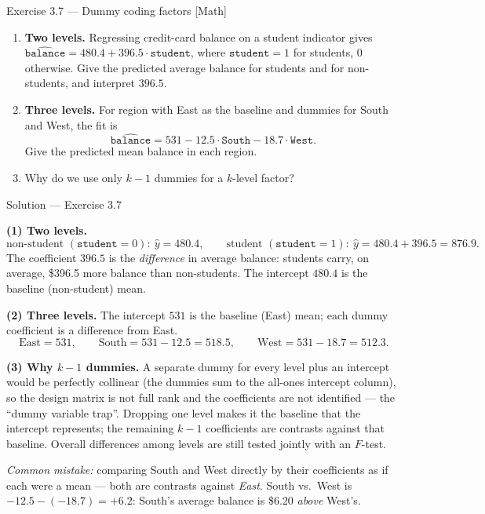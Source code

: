 \documentclass[aspectratio=169,11pt]{beamer}
\begin{document}
\begin{frame}{Exercise 3.7 --- Dummy coding factors [Math]}
  \begin{exercise}
    \begin{enumerate}
      \item \textbf{Two levels.} Regressing credit-card balance on a
            student indicator gives
            $\widehat{\texttt{balance}} = 480.4 + 396.5\cdot
            \texttt{student}$, where $\texttt{student}=1$ for students,
            $0$ otherwise. Give the predicted average balance for
            students and for non-students, and interpret $396.5$.
      \item \textbf{Three levels.} For region with East as the baseline
            and dummies for South and West, the fit is
            \[
              \widehat{\texttt{balance}} = 531 - 12.5\cdot\texttt{South}
                - 18.7\cdot\texttt{West}.
            \]
            Give the predicted mean balance in each region.
      \item Why do we use only $k-1$ dummies for a $k$-level factor?
    \end{enumerate}
  \end{exercise}
\end{frame}

\begin{frame}{Solution --- Exercise 3.7}
  \begin{solutionbox}
    \scriptsize
    \textbf{(1) Two levels.}
    \[
      \text{non-student }(\texttt{student}=0):\ \hat y = 480.4,\qquad
      \text{student }(\texttt{student}=1):\ \hat y = 480.4+396.5 = 876.9.
    \]
    The coefficient $396.5$ is the \emph{difference} in average balance:
    students carry, on average, \$396.5 more balance than non-students.
    The intercept $480.4$ is the baseline (non-student) mean.

    \textbf{(2) Three levels.} The intercept $531$ is the baseline
    (East) mean; each dummy coefficient is a difference from East.
    \[
      \text{East}=531,\qquad
      \text{South}=531-12.5=518.5,\qquad
      \text{West}=531-18.7=512.3.
    \]

    \textbf{(3) Why $k-1$ dummies.} A separate dummy for every level
    plus an intercept would be perfectly collinear (the dummies sum to
    the all-ones intercept column), so the design matrix is not full
    rank and the coefficients are not identified --- the ``dummy
    variable trap''. Dropping one level makes it the baseline that the
    intercept represents; the remaining $k-1$ coefficients are
    contrasts against that baseline. Overall differences among levels
    are still tested jointly with an $F$-test.

    \medskip
    \textit{Common mistake:} comparing South and West directly by their
    coefficients as if each were a mean --- both are contrasts against
    \emph{East}. South vs.\ West is $-12.5-(-18.7)=+6.2$: South's average
    balance is \$6.20 \emph{above} West's.
  \end{solutionbox}
\end{frame}
\end{document}
